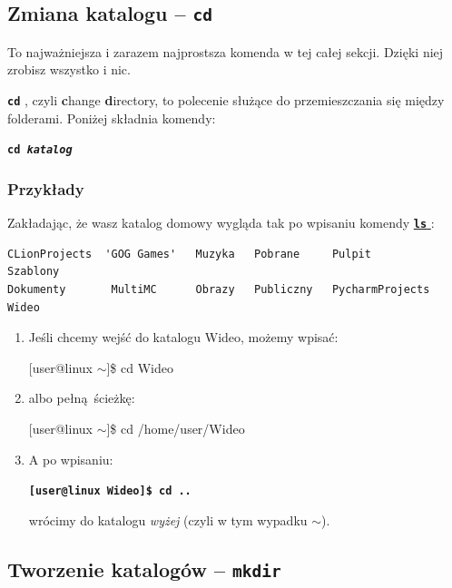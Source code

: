 \documentclass[12pt]{article}
\makeatletter
\newcommand{\ttbf}[1]{
    \texttt{\textbf{#1}}
}
\newenvironment{console1}
{
    \ttfamily
    \fontseries{b}
    \selectfont
    {[}user@linux $\sim${]}\$} {

    }
\makeatother
\begin{document}
\subsection{Zmiana katalogu -- \ttbf{cd}}
\label{sec:cd}

To najważniejsza i zarazem najprostsza komenda w tej całej sekcji. Dzięki niej zrobisz wszystko i nic.

\ttbf{cd}, czyli \textbf{c}hange \textbf{d}irectory, to polecenie służące do przemieszczania się między folderami. Poniżej składnia komendy:

\ttbf{cd \emph{katalog}}

\subsubsection{Przykłady}

Zakładając, że wasz katalog domowy wygląda tak po wpisaniu komendy \hyperref[sec:ls]{\ttbf{ls}}:

\begin{verbatim}
CLionProjects  'GOG Games'   Muzyka   Pobrane     Pulpit            Szablony
Dokumenty       MultiMC      Obrazy   Publiczny   PycharmProjects   Wideo
\end{verbatim}

\begin{enumerate}
    \item Jeśli chcemy wejść do katalogu Wideo, możemy wpisać:

    \begin{console1}
        cd Wideo
    \end{console1}

    \item albo pełną ścieżkę:

    \begin{console1}
        cd /home/user/Wideo
    \end{console1}

    \item A po wpisaniu:

    \ttbf{[user@linux Wideo]\$ cd ..}
    
    wrócimy do katalogu \emph{wyżej} (czyli w tym wypadku $\sim$).
\end{enumerate}

\subsection{Tworzenie katalogów -- \ttbf{mkdir}}
\end{document}
